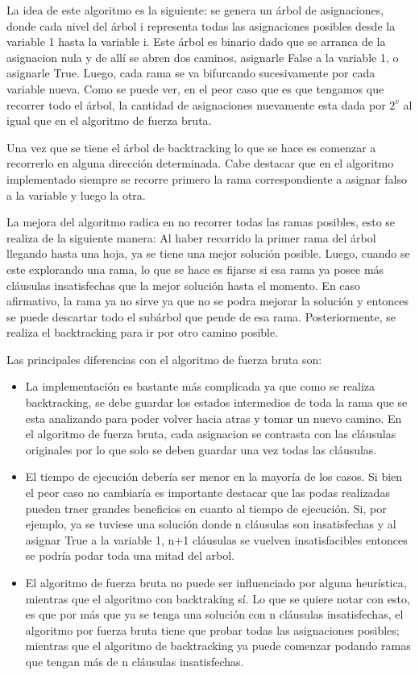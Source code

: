 \documentclass[a4paper,10pt]{article}
\begin{document}
\bigskip

La idea de este algoritmo es la siguiente: se genera un \'arbol de asignaciones, donde cada nivel del \'arbol i representa todas las asignaciones posibles desde la variable 1 hasta la variable i. Este \'arbol es binario dado que se arranca de la asignacion nula y de all\'i se abren dos caminos, asignarle False a la variable 1, o asignarle True. Luego, cada rama se va bifurcando sucesivamente por cada variable nueva. Como se puede ver, en el peor caso que es que tengamos que recorrer todo el \'arbol, la cantidad de asignaciones nuevamente esta dada por $2^{v}$ al igual que en el algoritmo de fuerza bruta.

Una vez que se tiene el \'arbol de backtracking lo que se hace es comenzar a recorrerlo en alguna direcci\'on determinada. Cabe destacar que en el algoritmo implementado siempre se recorre primero la rama correspondiente a asignar falso a la variable y luego la otra.

La mejora del algoritmo radica en no recorrer todas las ramas posibles, esto se realiza de la siguiente manera: Al haber recorrido la primer rama del \'arbol llegando hasta una hoja, ya se tiene una mejor soluci\'on posible. Luego, cuando se este explorando una rama, lo que se hace es fijarse si esa rama ya posee m\'as cl\'ausulas insatisfechas que la mejor soluci\'on hasta el momento. En caso afirmativo, la rama ya no sirve ya que no se podra mejorar la soluci\'on y entonces se puede descartar todo el sub\'arbol que pende de esa rama. Posteriormente, se realiza el backtracking para ir por otro camino posible. 

Las principales diferencias con el algoritmo de fuerza bruta son:
\begin{itemize}
\item La implementaci\'on es bastante m\'as complicada ya que como se realiza backtracking, se debe guardar los estados intermedios de toda la rama que se esta analizando para poder volver hacia atras y tomar un nuevo camino. En el algoritmo de fuerza bruta, cada asignacion se contrasta con las cl\'ausulas originales por lo que solo se deben guardar una vez todas las cl\'ausulas.
\item El tiempo de ejecuci\'on deber\'ia ser menor en la mayor\'ia de los casos. Si bien el peor caso no cambiar\'ia es importante destacar que las podas realizadas pueden traer grandes beneficios en cuanto al tiempo de ejecuci\'on. Si, por ejemplo, ya se tuviese una soluci\'on donde n cl\'ausulas son insatisfechas y al asignar True a la variable 1, n+1 cl\'ausulas se vuelven insatisfacibles entonces se podr\'ia podar toda una mitad del arbol.
\item El algoritmo de fuerza bruta no puede ser influenciado por alguna heur\'istica, mientras que el algoritmo con backtraking s\'i. Lo que se quiere notar con esto, es que por m\'as que ya se tenga una soluci\'on con n cl\'ausulas insatisfechas, el algoritmo por fuerza bruta tiene que probar todas las asignaciones posibles; mientras que el algoritmo de backtracking ya puede comenzar podando ramas que tengan m\'as de n cl\'ausulas insatisfechas.
\end{itemize}
\end{document}
